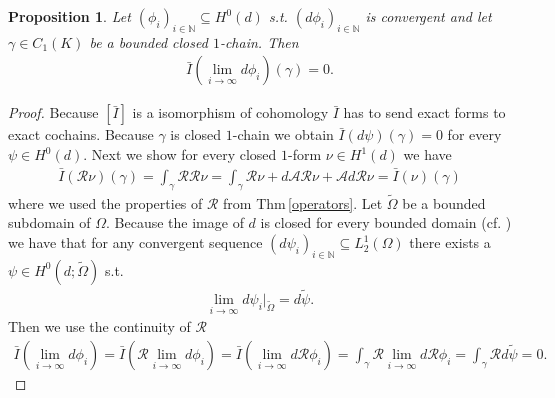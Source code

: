 \documentclass[12pt,a4paper]{article}
\newtheorem{proposition}{Proposition}
\theoremstyle{definition}
\newcommand{\aop}{\mathscr{A}}
\newcommand{\rop}{\mathscr{R}} %
\begin{document}
\begin{proposition}\label{integral_exact_form_zero}
    Let $(\phi_i)_{i\in\mathbb{N}} \subseteq H^0(d)$ s.t. 
    $(d\phi_i)_{i\in\mathbb{N}}$ 
    is convergent and let $\gamma \in C_1(K)$ be a bounded closed $1$-chain.
    Then
    \begin{align*}
        \bar{I}(\lim\limits_{i \rightarrow \infty}d\phi_i)(\gamma) = 0.
    \end{align*}
\end{proposition}
\begin{proof}
    
    Because 
    $[\bar{I}]$ is a isomorphism of cohomology $\bar{I}$ has to send 
    exact forms to exact cochains. Because $\gamma$ is closed $1$-chain 
    we obtain $\bar{I}(d\psi)(\gamma) = 0$ for every $\psi \in H^0(d)$.
    Next we show for every closed $1$-form $\nu \in H^1(d)$ we have 
    \begin{align*}
        \bar{I}(\rop \nu)(\gamma) = \int_\gamma \rop \rop \nu 
        = \int_\gamma \rop \nu + d\aop\rop\nu + \aop d\rop \nu 
        = \bar{I}(\nu)(\gamma)
    \end{align*}
    where we used the properties of $\rop$ from Thm\,\ref{operators}. 
    Let $\tilde{\Omega}$ be a bounded
    subdomain of $\Omega$.
    Because the image of $d$ is closed for every bounded domain 
    (cf. \cite[Lemma 7]{picard}) we have that for any convergent sequence 
    $(d\psi_i)_{i\in \mathbb{N}} \subseteq L^1_2(\Omega)$ 
    there exists a $\psi \in H^0(d;\tilde{\Omega})$ s.t.
    \begin{align*}
        \lim\limits_{i \rightarrow \infty}d\psi_i| _{\tilde{\Omega}} 
        = d\tilde{\psi}.
    \end{align*}
    Then we use the continuity of $\rop$
    \begin{align*}
        \bar{I}(\lim\limits_{i \rightarrow \infty}d\phi_i) =
        \bar{I}(\rop \lim\limits_{i \rightarrow \infty}d\phi_i) = 
        \bar{I}(\lim\limits_{i \rightarrow \infty}d\rop \phi_i) =
        \int_\gamma \rop \lim\limits_{i \rightarrow \infty}d\rop \phi_i =
        \int_\gamma \rop d\tilde{\psi} = 0.
    \end{align*}
\end{proof}
\end{document}
